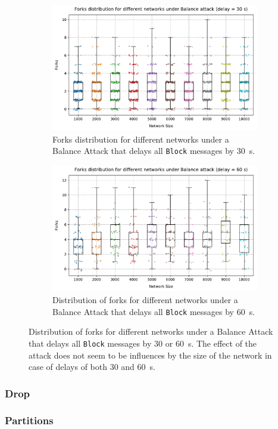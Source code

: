 \begin{figure}[h]
	\begin{subfigure}{\textwidth}
		\centering
		\includegraphics[width=\myplotswitdth \columnwidth]{plots/forks_attack_delay_30_network_sizes_boxplot}
		\vspace*{0.25cm}
		\caption{Forks distribution for different networks under a Balance Attack that delays all \texttt{Block} messages by \SI{30}{\second}.}
		\vspace*{0.75cm}
	\end{subfigure}
	\begin{subfigure}{\textwidth}
		\centering
		\vspace*{0.25cm}
		\includegraphics[width=\myplotswitdth \columnwidth]{plots/forks_attack_delay_60_network_sizes_boxplot}
		\vspace*{0.25cm}
		\caption{Distribution of forks for different networks under a Balance Attack that delays all \texttt{Block} messages by \SI{60}{\second}.}
		\vspace*{0.25cm}
	\end{subfigure}
	\caption[Forks distribution for different networks under Balance Attack]{
		Distribution of forks for different networks under a Balance Attack that delays all \texttt{Block} messages by \num{30} or \SI{60}{\second}.
		The effect of the attack does not seem to be influences by the size of the network in case of delays of both \num{30} and \SI{60}{\second}.
	}
	\label{fig:forks-attack-sizes}
\end{figure}

\subsubsection{Drop}

\subsubsection{Partitions}

